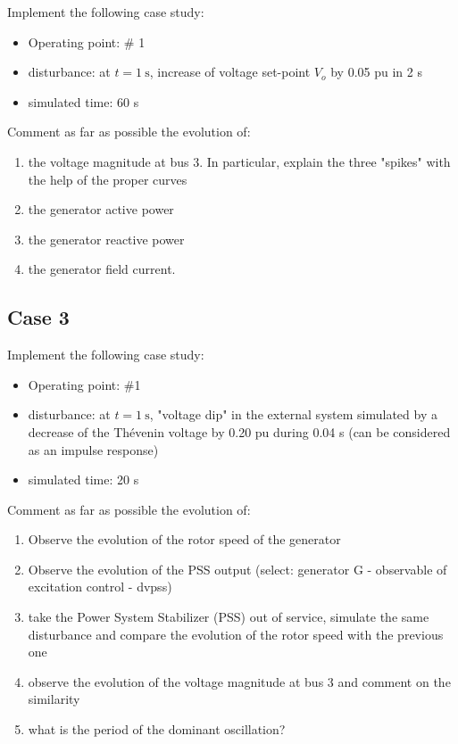 \documentclass[a4paper,11pt,oneside,onecolumn]{article}
\begin{document}
Implement the following case study:
\begin{itemize}
\item  Operating point: \# 1
\item  disturbance: at $t=1 \mathrm{~s}$, increase of voltage set-point $V_o$ by 0.05 pu in 2 s
\item simulated time: 60 s
\end{itemize}

\noindent Comment as far as possible the evolution of:
\begin{enumerate}
\item the voltage magnitude at bus 3. In particular, explain the three "spikes" with the help of the proper curves
\item the generator active power
\item the generator reactive power
\item the generator field current.
\end{enumerate}

\subsection{Case 3}

Implement the following case study:
\begin{itemize}
\item Operating point: \#1
\item disturbance: at $t=1 \mathrm{~s}$, "voltage dip" in the external system simulated by a decrease of the Thévenin voltage by 0.20 pu during 0.04 s (can be considered as an impulse response)
\item simulated time: 20 s
\end{itemize}

\noindent Comment as far as possible the evolution of:
\begin{enumerate}
\item Observe the evolution of the rotor speed of the generator
\item Observe the evolution of the PSS output (select: generator G - observable of excitation control - dvpss)
\item take the Power System Stabilizer (PSS) out of service, simulate the same disturbance and compare the evolution of the rotor speed with the previous one
\item observe the evolution of the voltage magnitude at bus 3 and comment on the similarity
\item what is the period of the dominant oscillation?
	
\end{enumerate}
\end{document}
